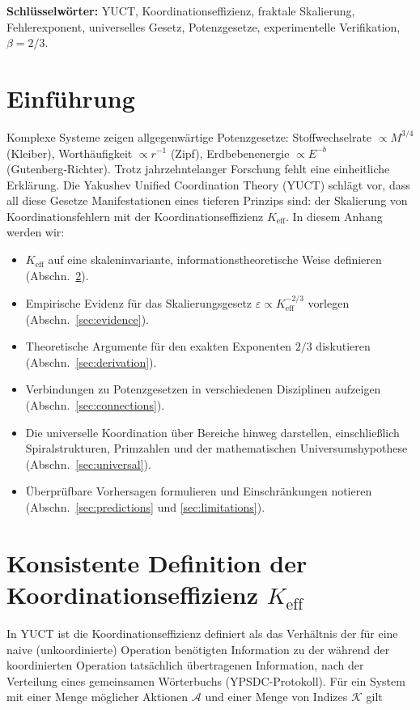\documentclass[12pt]{article}
\newcommand{\Keff}{K_{\mathrm{eff}}}
\newcommand{\eps}{\varepsilon}
\begin{document}
\begin{titlepage}
\begin{center}
			\textbf{Schlüsselwörter:} YUCT, Koordinationseffizienz, fraktale Skalierung, Fehlerexponent, universelles Gesetz, Potenzgesetze, experimentelle Verifikation, \(\beta = 2/3\).
		\end{center}
	\end{titlepage}
	
	\tableofcontents
	\newpage
	
	\section{Einführung}
	Komplexe Systeme zeigen allgegenwärtige Potenzgesetze: Stoffwechselrate \(\propto M^{3/4}\) (Kleiber), Worthäufigkeit \(\propto r^{-1}\) (Zipf), Erdbebenenergie \(\propto E^{-b}\) (Gutenberg‑Richter). Trotz jahrzehntelanger Forschung fehlt eine einheitliche Erklärung. Die Yakushev Unified Coordination Theory (YUCT) schlägt vor, dass all diese Gesetze Manifestationen eines tieferen Prinzips sind: der Skalierung von Koordinationsfehlern mit der Koordinationseffizienz \(\Keff\). In diesem Anhang werden wir:
	\begin{itemize}
		\item \(\Keff\) auf eine skaleninvariante, informationstheoretische Weise definieren (Abschn.~\ref{sec:keff}).
		\item Empirische Evidenz für das Skalierungsgesetz \(\eps \propto \Keff^{-2/3}\) vorlegen (Abschn.~\ref{sec:evidence}).
		\item Theoretische Argumente für den exakten Exponenten \(2/3\) diskutieren (Abschn.~\ref{sec:derivation}).
		\item Verbindungen zu Potenzgesetzen in verschiedenen Disziplinen aufzeigen (Abschn.~\ref{sec:connections}).
		\item Die universelle Koordination über Bereiche hinweg darstellen, einschließlich Spiralstrukturen, Primzahlen und der mathematischen Universumshypothese (Abschn.~\ref{sec:universal}).
		\item Überprüfbare Vorhersagen formulieren und Einschränkungen notieren (Abschn.~\ref{sec:predictions} und \ref{sec:limitations}).
	\end{itemize}
	
	\section{Konsistente Definition der Koordinationseffizienz \(\Keff\)}
	\label{sec:keff}
	
	In YUCT ist die Koordinationseffizienz definiert als das Verhältnis der für eine naive (unkoordinierte) Operation benötigten Information zu der während der koordinierten Operation tatsächlich übertragenen Information, nach der Verteilung eines gemeinsamen Wörterbuchs (YPSDC-Protokoll). Für ein System mit einer Menge möglicher Aktionen \(\mathcal{A}\) und einer Menge von Indizes \(\mathcal{K}\) gilt
	
\end{document}
